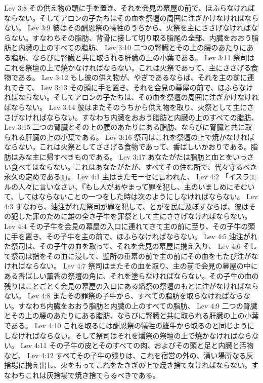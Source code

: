 Lev 3:8  その供え物の頭に手を置き、それを会見の幕屋の前で、ほふらなければならない。そしてアロンの子たちはその血を祭壇の周囲に注ぎかけなければならない。
Lev 3:9  彼はその酬恩祭の犠牲のうちから、火祭を主にささげなければならない。すなわちその脂肪、背骨に接して切り取る脂尾の全部、内臓をおおう脂肪と内臓の上のすべての脂肪、
Lev 3:10  二つの腎臓とその上の腰のあたりにある脂肪、ならびに腎臓と共に取られる肝臓の上の小葉である。
Lev 3:11  祭司はこれを祭壇の上で焼かなければならない。これは火祭であって、主にささげる食物である。
Lev 3:12  もし彼の供え物が、やぎであるならば、それを主の前に連れてきて、
Lev 3:13  その頭に手を置き、それを会見の幕屋の前で、ほふらなければならない。そしてアロンの子たちは、その血を祭壇の周囲に注ぎかけなければならない。
Lev 3:14  彼はまたそのうちから供え物を取り、火祭として主にささげなければならない。すなわち内臓をおおう脂肪と内臓の上のすべての脂肪、
Lev 3:15  二つの腎臓とその上の腰のあたりにある脂肪、ならびに腎臓と共に取られる肝臓の上の小葉である。
Lev 3:16  祭司はこれを祭壇の上で焼かなければならない。これは火祭としてささげる食物であって、香ばしいかおりである。脂肪はみな主に帰すべきものである。
Lev 3:17  あなたがたは脂肪と血とをいっさい食べてはならない。これはあなたがたが、すべてその住む所で、代々守るべき永久の定めである』」。
Lev 4:1  主はまたモーセに言われた、
Lev 4:2  「イスラエルの人々に言いなさい、『もし人があやまって罪を犯し、主のいましめにそむいて、してはならないことの一つをした時は次のようにしなければならない。
Lev 4:3  すなわち、油注がれた祭司が罪を犯して、とがを民に及ぼすならば、彼はその犯した罪のために雄の全き子牛を罪祭として主にささげなければならない。
Lev 4:4  その子牛を会見の幕屋の入口に連れてきて主の前に至り、その子牛の頭に手を置き、その子牛を主の前で、ほふらなければならない。
Lev 4:5  油注がれた祭司は、その子牛の血を取って、それを会見の幕屋に携え入り、
Lev 4:6  そして祭司は指をその血に浸して、聖所の垂幕の前で主の前にその血を七たび注がなければならない。
Lev 4:7  祭司はまたその血を取り、主の前で会見の幕屋の中にある香ばしい薫香の祭壇の角に、それを塗らなければならない。その子牛の血の残りはことごとく会見の幕屋の入口にある燔祭の祭壇のもとに注がなければならない。
Lev 4:8  またその罪祭の子牛から、すべての脂肪を取らなければならない。すなわち内臓をおおう脂肪と内臓の上のすべての脂肪、
Lev 4:9  二つの腎臓とその上の腰のあたりにある脂肪、ならびに腎臓と共に取られる肝臓の上の小葉である。
Lev 4:10  これを取るには酬恩祭の犠牲の雄牛から取るのと同じようにしなければならない。そして祭司はそれを燔祭の祭壇の上で焼かなければならない。
Lev 4:11  その子牛の皮とそのすべての肉、およびその頭と足と内臓と汚物など、
Lev 4:12  すべてその子牛の残りは、これを宿営の外の、清い場所なる灰捨場に携え出し、火をもってこれをたきぎの上で焼き捨てなければならない。すなわちこれは灰捨場で焼き捨てらるべきである。
